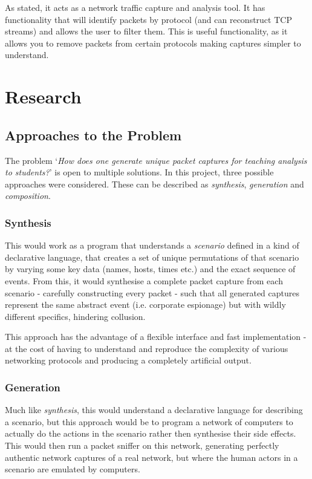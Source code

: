 \documentclass[10pt,a4paper,notitlepage]{report}
\begin{document}
As stated, it acts as a network traffic capture and analysis tool. It has functionality that will identify packets by protocol (and can reconstruct TCP streams) and allows the user to filter them. This is useful functionality, as it allows you to remove packets from certain protocols making captures simpler to understand.

\chapter{Research}
\section{Approaches to the Problem}
The problem `\emph{How does one generate unique packet captures for teaching analysis to students?}' is open to multiple solutions. In this project, three possible approaches were considered. These can be described as \emph{synthesis}, \emph{generation} and \emph{composition}.

\subsection{Synthesis}
This would work as a program that understands a \emph{scenario} defined in a kind of declarative language, that creates a set of unique permutations of that scenario by varying some key data (names, hosts, times etc.) and the exact sequence of events. From this, it would synthesise a complete packet capture from each scenario - carefully constructing every packet - such that all generated captures represent the same abstract event (i.e. corporate espionage) but with wildly different specifics, hindering collusion.

This approach has the advantage of a flexible interface and fast implementation - at the cost of having to understand and reproduce the complexity of various networking protocols and producing a completely artificial output.

\subsection{Generation}
Much like \emph{synthesis}, this would understand a declarative language for describing a scenario, but this approach would be to program a network of computers to actually do the actions in the scenario rather then synthesise their side effects. This would then run a packet sniffer on this network, generating perfectly authentic network captures of a real network, but where the human actors in a scenario are emulated by computers.
\end{document}
